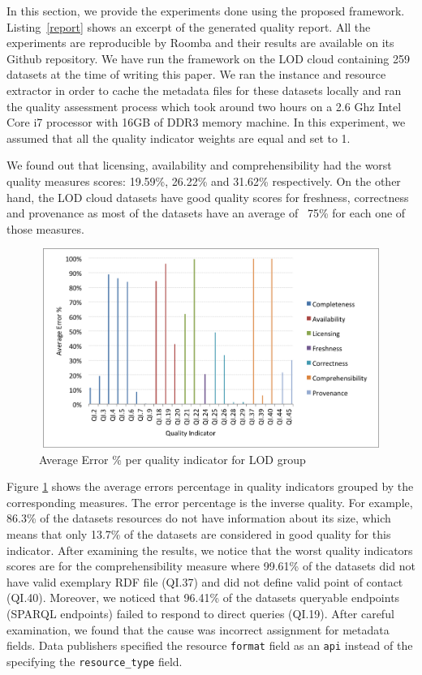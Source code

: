 \documentclass[onecolumn, crcready]{../../Tools/LaTEX/iosart2c}
\begin{document}
In this section, we provide the experiments done using the proposed framework. Listing~\ref{report} shows an excerpt of the generated quality report. All the experiments are reproducible by Roomba and their results are available on its Github repository. We have run the framework on the LOD cloud containing 259 datasets at the time of writing this paper. We ran the instance and resource extractor in order to cache the metadata files for these datasets locally and ran the quality assessment process which took around two hours on a 2.6 Ghz Intel Core i7 processor with 16GB of DDR3 memory machine. In this experiment, we assumed that all the quality indicator weights are equal and set to 1.

We found out that licensing, availability and comprehensibility had the worst quality measures scores: 19.59\%, 26.22\% and 31.62\% respectively. On the other hand, the LOD cloud datasets have good quality scores for freshness, correctness and provenance as most of the datasets have an average of ~75\% for each one of those measures.

\begin{figure}[ht]
  \centering
    \includegraphics[height=6.5cm, width=12cm]{LOD_quality_indicators_grouped.png}
  \caption{Average Error \% per quality indicator for LOD group}
  \label{fig:average-error-lod-group}
\end{figure}

Figure \ref{fig:average-error-lod-group} shows the average errors percentage in quality indicators grouped by the corresponding measures. The error percentage is the inverse quality. For example, 86.3\% of the datasets resources do not have information about its size, which means that only 13.7\% of the datasets are considered in good quality for this indicator. After examining the results, we notice that the worst quality indicators scores are for the comprehensibility measure where 99.61\% of the datasets did not have valid exemplary RDF file (QI.37) and did not define valid point of contact (QI.40). Moreover, we noticed that 96.41\% of the datasets queryable endpoints (SPARQL endpoints) failed to respond to direct queries (QI.19). After careful examination, we found that the cause was incorrect assignment for metadata fields. Data publishers specified the resource \texttt{format} field as an \texttt{api} instead of the specifying the \texttt{resource\_type} field.
\end{document}
